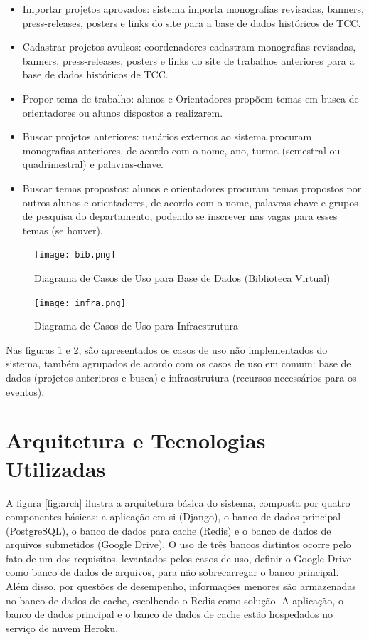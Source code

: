 \begin{itemize}
    \item Importar projetos aprovados: sistema importa monografias revisadas, banners, press-releases, posters e links do site para a base de dados históricos de TCC.
    \item Cadastrar projetos avulsos: coordenadores cadastram monografias revisadas, banners, press-releases, posters e links do site de trabalhos anteriores para a base de dados históricos de TCC.
    \item Propor tema de trabalho: alunos e Orientadores propõem temas em busca de orientadores ou alunos dispostos a realizarem.
    \item Buscar projetos anteriores: usuários externos ao sistema procuram monografias anteriores, de acordo com o nome, ano, turma (semestral ou quadrimestral) e palavras-chave.
    \item Buscar temas propostos: alunos e orientadores procuram temas propostos por outros alunos e orientadores, de acordo com o nome, palavras-chave e grupos de pesquisa do departamento, podendo se inscrever nas vagas para esses temas (se houver).
\end{itemize}

\begin{figure}[H]
    \centering
    \texttt{[image: bib.png]}
    \caption{Diagrama de Casos de Uso para Base de Dados (Biblioteca Virtual)}
    \label{fig:use-case-bib}
\end{figure}

\begin{figure}[H]
    \centering
    \texttt{[image: infra.png]}
    \caption{Diagrama de Casos de Uso para Infraestrutura}
    \label{fig:use-case-infra}
\end{figure}

Nas figuras \ref{fig:use-case-bib} e \ref{fig:use-case-infra}, são apresentados os casos de uso não implementados do sistema, também agrupados de acordo com os casos de uso em comum: base de dados (projetos anteriores e busca) e infraestrutura (recursos necessários para os eventos). 

\section{Arquitetura e Tecnologias Utilizadas}

A figura \ref{fig:arch} ilustra a arquitetura básica do sistema, composta por quatro componentes básicas: a aplicação em si (Django), o banco de dados principal (PostgreSQL), o banco de dados para cache (Redis) e o banco de dados de arquivos submetidos (Google Drive). O uso de três bancos distintos ocorre pelo fato de um dos requisitos, levantados pelos casos de uso, definir o Google Drive como banco de dados de arquivos, para não sobrecarregar o banco principal. Além disso, por questões de desempenho, informações menores são armazenadas no banco de dados de cache, escolhendo o Redis como solução. A aplicação, o banco de dados principal e o banco de dados de cache estão hospedados no serviço de nuvem Heroku.

